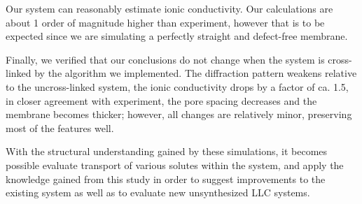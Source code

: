 \documentclass[journal=jpcbfk,manuscript=article]{achemso}
\begin{document}
  Our system can reasonably estimate ionic conductivity. Our
  calculations are about 1 order of magnitude higher than experiment, however
  that is to be expected since we are simulating a perfectly straight and
  defect-free membrane. 

  Finally, we verified that our conclusions do not change when the system is
  cross-linked by the algorithm we implemented. The diffraction pattern weakens
  relative to the uncross-linked system, the ionic conductivity drops by a factor
  of ca. 1.5, in closer agreement with experiment, the pore spacing decreases and
  the membrane becomes thicker; however, all changes are relatively minor, 
  preserving most of the features well.


  With the structural understanding gained by these simulations, it becomes
  possible evaluate transport of various solutes within the system, and apply the
  knowledge gained from this study in order to suggest improvements to the
  existing system as well as to evaluate new unsynthesized LLC systems.

  \clearpage
  
\end{document}
